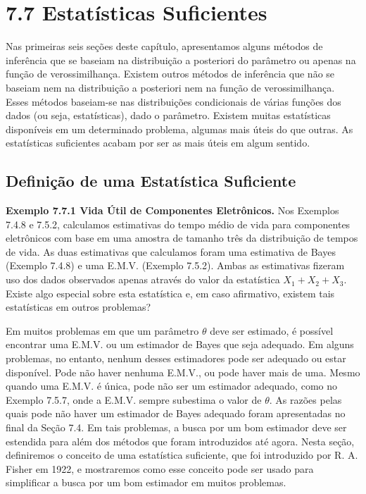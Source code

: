 \section*{7.7 Estatísticas Suficientes}

Nas primeiras seis seções deste capítulo, apresentamos alguns métodos de inferência que se baseiam na distribuição a posteriori do parâmetro ou apenas na função de verossimilhança. Existem outros métodos de inferência que não se baseiam nem na distribuição a posteriori nem na função de verossimilhança. Esses métodos baseiam-se nas distribuições condicionais de várias funções dos dados (ou seja, estatísticas), dado o parâmetro. Existem muitas estatísticas disponíveis em um determinado problema, algumas mais úteis do que outras. As estatísticas suficientes acabam por ser as mais úteis em algum sentido.

\subsection*{Definição de uma Estatística Suficiente}

\textbf{Exemplo 7.7.1 Vida Útil de Componentes Eletrônicos.} Nos Exemplos 7.4.8 e 7.5.2, calculamos estimativas do tempo médio de vida para componentes eletrônicos com base em uma amostra de tamanho três da distribuição de tempos de vida. As duas estimativas que calculamos foram uma estimativa de Bayes (Exemplo 7.4.8) e uma E.M.V. (Exemplo 7.5.2). Ambas as estimativas fizeram uso dos dados observados apenas através do valor da estatística $X_1 + X_2 + X_3$. Existe algo especial sobre esta estatística e, em caso afirmativo, existem tais estatísticas em outros problemas?

Em muitos problemas em que um parâmetro $\theta$ deve ser estimado, é possível encontrar uma E.M.V. ou um estimador de Bayes que seja adequado. Em alguns problemas, no entanto, nenhum desses estimadores pode ser adequado ou estar disponível. Pode não haver nenhuma E.M.V., ou pode haver mais de uma. Mesmo quando uma E.M.V. é única, pode não ser um estimador adequado, como no Exemplo 7.5.7, onde a E.M.V. sempre subestima o valor de $\theta$. As razões pelas quais pode não haver um estimador de Bayes adequado foram apresentadas no final da Seção 7.4. Em tais problemas, a busca por um bom estimador deve ser estendida para além dos métodos que foram introduzidos até agora. Nesta seção, definiremos o conceito de uma estatística suficiente, que foi introduzido por R. A. Fisher em 1922, e mostraremos como esse conceito pode ser usado para simplificar a busca por um bom estimador em muitos problemas.

